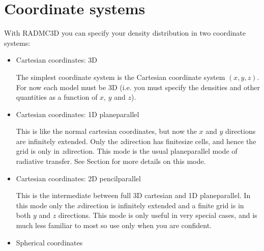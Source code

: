 \documentclass[letterpaper,10pt,english]{sphinxmanual}
\begin{document}
\section{Coordinate systems}
\label{\detokenize{basicstructure:coordinate-systems}}\label{\detokenize{basicstructure:sec-coord-systems}}
With RADMC\sphinxhyphen{}3D you can specify your density distribution in two coordinate
systems:
\begin{itemize}
\item {} 
Cartesian coordinates: 3\sphinxhyphen{}D

The simplest coordinate system is the Cartesian coordinate system
\((x,y,z)\). For now each model must be 3\sphinxhyphen{}D (i.e. you must specify the
densities and other quantities as a function of \(x\), \(y\) and \(z\)).

\item {} 
Cartesian coordinates: 1\sphinxhyphen{}D plane\sphinxhyphen{}parallel

This is like the normal cartesian coordinates, but now the \(x\)\sphinxhyphen{} and \(y\)\sphinxhyphen{}
directions are infinitely extended. Only the \(z\)\sphinxhyphen{}direction has
finite\sphinxhyphen{}size cells, and hence the grid is only in \(z\)\sphinxhyphen{}direction.  This mode
is the usual plane\sphinxhyphen{}parallel mode of radiative transfer. See Section
{\hyperref[\detokenize{gridding:sec-1d-plane-parallel}]{}} for more details on this mode.

\item {} 
Cartesian coordinates: 2\sphinxhyphen{}D pencil\sphinxhyphen{}parallel

This is the intermediate between full 3\sphinxhyphen{}D cartesian and 1\sphinxhyphen{}D
plane\sphinxhyphen{}parallel.  In this mode only the \(x\)\sphinxhyphen{}direction is infinitely
extended and a finite grid is in both \(y\) and \(z\) directions. This mode is
only useful in very special cases, and is much less familiar to most \sphinxhyphen{} so
use only when you are confident.

\item {} 
Spherical coordinates


\end{itemize}
\end{document}
